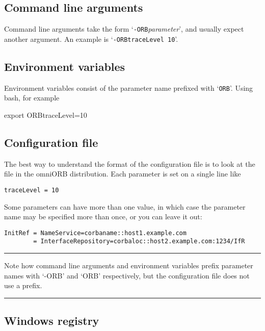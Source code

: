 \documentclass[draft,11pt,twoside,a4paper]{book}
\newcommand{\cmdline}[1]{\texttt{#1}}
\newenvironment{statement}%
 {\noindent\begin{minipage}{\textwidth}%
  \vspace{.5\baselineskip}%
  \noindent\rule{\textwidth}{2pt}%
  \vspace{.25\baselineskip}%
  \begin{list}{}{\setlength{\listparindent}{0em}%
                 \setlength{\itemindent}{0em}%
                 \setlength{\leftmargin}{1.5em}%
                 \setlength{\rightmargin}{\leftmargin}%
                 \setlength{\topsep}{0pt}%
                 \setlength{\partopsep}{0pt}}
  \item\relax}
 {\end{list}%
  \vspace{-.25\baselineskip}%
  \noindent\rule{\textwidth}{2pt}%
  \vspace{.5\baselineskip}%
  \end{minipage}}
\newcommand{\file}{\begingroup \urlstyle{tt}\Url}
\begin{document}
\subsection{Command line arguments}
\label{sec:ORBargs}

Command line arguments take the form
`\cmdline{-ORB}\textit{parameter}', and usually expect another
argument. An example is `\cmdline{-ORBtraceLevel 10}'.


\subsection{Environment variables}

Environment variables consist of the parameter name prefixed with
`\cmdline{ORB}'. Using bash, for example

\begin{makelisting}
export ORBtraceLevel=10
\end{makelisting}


\subsection{Configuration file}

The best way to understand the format of the configuration file is to
look at the \file{sample.cfg} file in the omniORB distribution. Each
parameter is set on a single line like

\begin{verbatim}
traceLevel = 10
\end{verbatim}

Some parameters can have more than one value, in which case the
parameter name may be specified more than once, or you can leave it
out:

\begin{verbatim}
InitRef = NameService=corbaname::host1.example.com
        = InterfaceRepository=corbaloc::host2.example.com:1234/IfR
\end{verbatim}


\begin{statement}
Note how command line arguments and environment variables prefix
parameter names with `-ORB' and `ORB' respectively, but the
configuration file does not use a prefix.
\end{statement}


\subsection{Windows registry}
\end{document}
